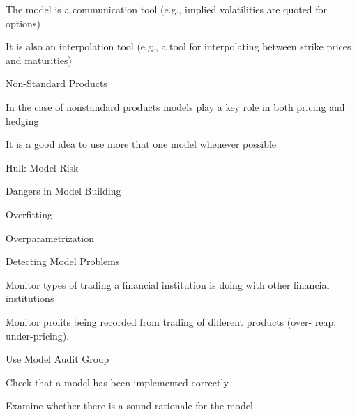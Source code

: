 	The model is a communication tool (e.g., implied volatilities are quoted for options)

	It is also an interpolation tool (e.g., a tool for interpolating between strike prices and maturities)






	Non-Standard Products






	In the case of nonstandard products models play a key role in both pricing and hedging

	It is a good idea to use more that one model whenever possible











{Hull: Model Risk}






	Dangers in Model Building






	Overfitting

	Overparametrization






	Detecting Model Problems






	Monitor types of trading a financial institution is doing with other financial institutions

	Monitor profits being recorded from trading of different products (over- reap. under-pricing).

	Use Model Audit Group






	Check that a model has been implemented correctly

	Examine whether there is a sound rationale for the model

